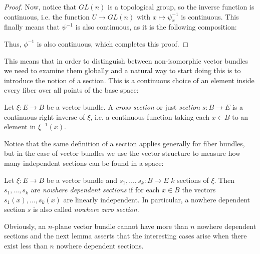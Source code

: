\begin{proof}
Now, notice that $GL(n)$ is a topological group, so the inverse function is continuous, i.e. the function $U\to GL(n)$ with $x\mapsto\psi_x^{-1}$ is continuous. This finally means that $\psi^{-1}$ is also continuous, as it is the following composition:
\begin{center}
\end{center}
Thus, $\phi^{-1}$ is also continuous, which completes this proof.
\end{proof}

This means that in order to distinguish between non-isomorphic vector bundles we need to examine them globally and a natural way to start doing this is to introduce the notion of a section. This is a continuous choice of an element inside every fiber over all points of the base space:

\begin{definition} Let $\xi:E\to B$ be a vector bundle. A \emph{cross section} or just \emph{section} $s:B\to E$ is a continuous right inverse of $\xi$, i.e. a continuous function taking each $x\in B$ to an element in $\xi^{-1}(x)$.
\end{definition}

Notice that the same definition of a section applies generally for fiber bundles, but in the case of vector bundles we use the vector structure to measure how many independent sections can be found in a space:

\begin{definition} Let $\xi:E\to B$ be a vector bundle and $s_1,\ldots,s_k:B\to E$ $k$ sections of $\xi$. Then $s_1,\ldots,s_k$ are \emph{nowhere dependent sections} if for each $x\in B$ the vectors $s_1(x),\ldots,s_k(x)$ are linearly independent. In particular, a nowhere dependent section $s$ is also called \emph{nowhere zero section}.
\end{definition}

Obviously, an $n$-plane vector bundle cannot have more than $n$ nowhere dependent sections and the next lemma asserts that the interesting cases arise when there exist less than $n$ nowhere dependent sections.

